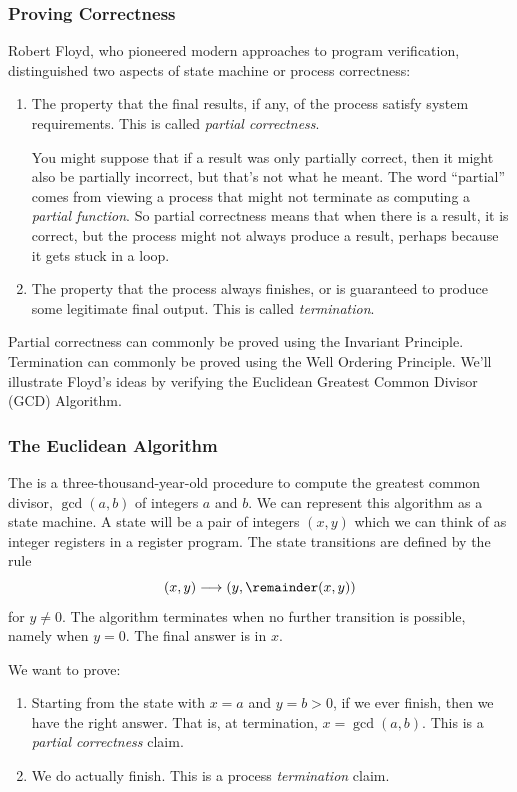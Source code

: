 \subsubsection{Proving Correctness}

Robert Floyd, who pioneered modern approaches to program verification,
distinguished two aspects of state machine or process correctness:

\begin{enumerate}
\item The property that the final results, if any, of the process satisfy
system requirements.  This is called \emph{partial correctness}.

You might suppose that if a result was only partially correct, then it
might also be partially incorrect, but that's not what he meant.  The word
``partial'' comes from viewing a process that might not terminate as
computing a \emph{partial function}.  So partial correctness means that
when there is a result, it is correct, but the process might not always
produce a result, perhaps because it gets stuck in a loop.

\item The property that the process always finishes, or is guaranteed to
produce some legitimate final output.  This is called \emph{termination}.
\end{enumerate}

Partial correctness can commonly be proved using the Invariant Principle.
Termination can commonly be proved using the Well Ordering Principle.
We'll illustrate Floyd's ideas by verifying the Euclidean Greatest Common
Divisor (GCD) Algorithm.

\subsubsection{The Euclidean Algorithm}\label{euclid}

The  is a
three-thousand-year-old procedure to compute the greatest common divisor,
$\gcd(a,b)$ of integers $a$ and $b$.  We can represent this algorithm as a
state machine.  A state will be a pair of integers $(x,y)$ which we can
think of as integer registers in a register program.  The state
transitions are defined by the rule
\[
(x,y) \movesto (y, \remainder(x,y))
\]
for $y \neq 0$.  The algorithm terminates when no further transition is
possible, namely when $y=0$.  The final answer is in $x$.

We want to prove:
\begin{enumerate}
\item Starting from the state with $x = a$ and $y = b>0$, if we ever finish,
then we have the right answer.  That is, at termination, $x = \gcd(a,b)$.
This is a \emph{partial correctness} claim.

\item We do actually finish.  This is a process \emph{termination} claim.

\end{enumerate}

